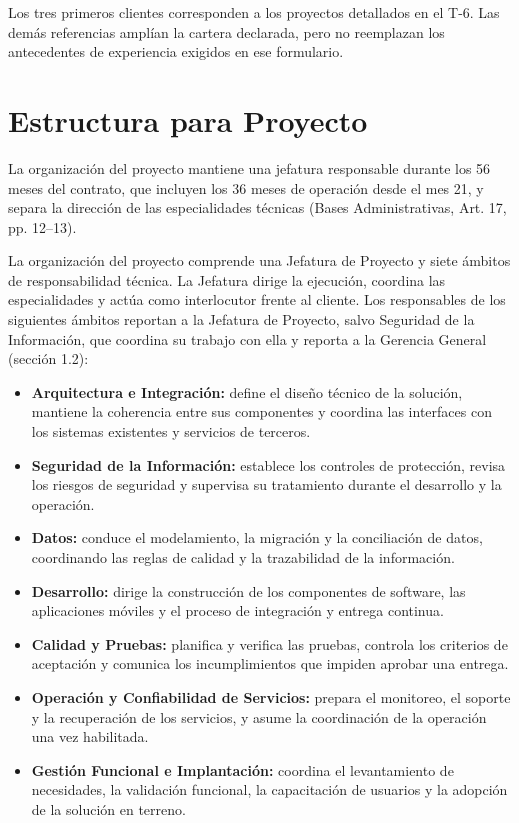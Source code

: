 Los tres primeros clientes corresponden a los proyectos detallados en el T-6. Las demás referencias amplían la cartera declarada, pero no reemplazan los antecedentes de experiencia exigidos en ese formulario.

\section{Estructura para Proyecto}

La organización del proyecto mantiene una jefatura responsable durante los 56 meses del contrato, que incluyen los 36 meses de operación desde el mes 21, y separa la dirección de las especialidades técnicas (Bases Administrativas, Art. 17, pp. 12--13).

La organización del proyecto comprende una Jefatura de Proyecto y siete ámbitos de responsabilidad técnica. La Jefatura dirige la ejecución, coordina las especialidades y actúa como interlocutor frente al cliente. Los responsables de los siguientes ámbitos reportan a la Jefatura de Proyecto, salvo Seguridad de la Información, que coordina su trabajo con ella y reporta a la Gerencia General (sección 1.2):
\begin{itemize}
    \item \textbf{Arquitectura e Integración:} define el diseño técnico de la solución, mantiene la coherencia entre sus componentes y coordina las interfaces con los sistemas existentes y servicios de terceros.
    \item \textbf{Seguridad de la Información:} establece los controles de protección, revisa los riesgos de seguridad y supervisa su tratamiento durante el desarrollo y la operación.
    \item \textbf{Datos:} conduce el modelamiento, la migración y la conciliación de datos, coordinando las reglas de calidad y la trazabilidad de la información.
    \item \textbf{Desarrollo:} dirige la construcción de los componentes de software, las aplicaciones móviles y el proceso de integración y entrega continua.
    \item \textbf{Calidad y Pruebas:} planifica y verifica las pruebas, controla los criterios de aceptación y comunica los incumplimientos que impiden aprobar una entrega.
    \item \textbf{Operación y Confiabilidad de Servicios:} prepara el monitoreo, el soporte y la recuperación de los servicios, y asume la coordinación de la operación una vez habilitada.
    \item \textbf{Gestión Funcional e Implantación:} coordina el levantamiento de necesidades, la validación funcional, la capacitación de usuarios y la adopción de la solución en terreno.
\end{itemize}

